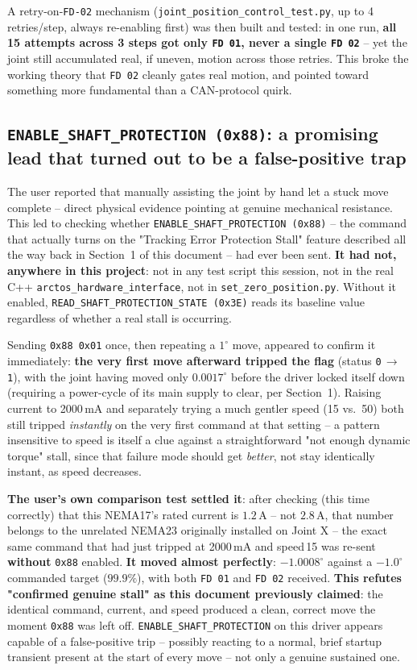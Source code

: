 \documentclass[11pt,letterpaper]{article}
\begin{document}
A retry-on-\texttt{FD-02} mechanism (\texttt{joint\_position\_control\_test.py}, up to 4 retries/step, always re-enabling first) was then built and tested: in one run, \textbf{all 15 attempts across 3 steps got only \texttt{FD 01}, never a single \texttt{FD 02}} -- yet the joint still accumulated real, if uneven, motion across those retries. This broke the working theory that \texttt{FD 02} cleanly gates real motion, and pointed toward something more fundamental than a CAN-protocol quirk.

\subsection{\texttt{ENABLE\_SHAFT\_PROTECTION (0x88)}: a promising lead that turned out to be a false-positive trap}
\label{sec:shaft-protection-resolution}
The user reported that manually assisting the joint by hand let a stuck move complete -- direct physical evidence pointing at genuine mechanical resistance. This led to checking whether \texttt{ENABLE\_SHAFT\_PROTECTION (0x88)} -- the command that actually turns on the "Tracking Error Protection Stall" feature described all the way back in Section~1 of this document -- had ever been sent. \textbf{It had not, anywhere in this project}: not in any test script this session, not in the real C++ \texttt{arctos\_hardware\_interface}, not in \texttt{set\_zero\_position.py}. Without it enabled, \texttt{READ\_SHAFT\_PROTECTION\_STATE (0x3E)} reads its baseline value regardless of whether a real stall is occurring.

Sending \texttt{0x88 0x01} once, then repeating a $1^\circ$ move, appeared to confirm it immediately: \textbf{the very first move afterward tripped the flag} (status \texttt{0}\,$\to$\,\texttt{1}), with the joint having moved only $0.0017^\circ$ before the driver locked itself down (requiring a power-cycle of its main supply to clear, per Section~1). Raising current to 2000\,mA and separately trying a much gentler speed (15 vs.\ 50) both still tripped \emph{instantly} on the very first command at that setting -- a pattern insensitive to speed is itself a clue against a straightforward "not enough dynamic torque" stall, since that failure mode should get \emph{better}, not stay identically instant, as speed decreases.

\textbf{The user's own comparison test settled it}: after checking (this time correctly) that this NEMA17's rated current is $1.2$\,A -- not $2.8$\,A, that number belongs to the unrelated NEMA23 originally installed on Joint X -- the exact same command that had just tripped at 2000\,mA and speed\,15 was re-sent \textbf{without} \texttt{0x88} enabled. \textbf{It moved almost perfectly}: $-1.0008^\circ$ against a $-1.0^\circ$ commanded target ($99.9\%$), with both \texttt{FD 01} and \texttt{FD 02} received. \textbf{This refutes "confirmed genuine stall" as this document previously claimed}: the identical command, current, and speed produced a clean, correct move the moment \texttt{0x88} was left off. \texttt{ENABLE\_SHAFT\_PROTECTION} on this driver appears capable of a false-positive trip -- possibly reacting to a normal, brief startup transient present at the start of every move -- not only a genuine sustained one.
\end{document}
